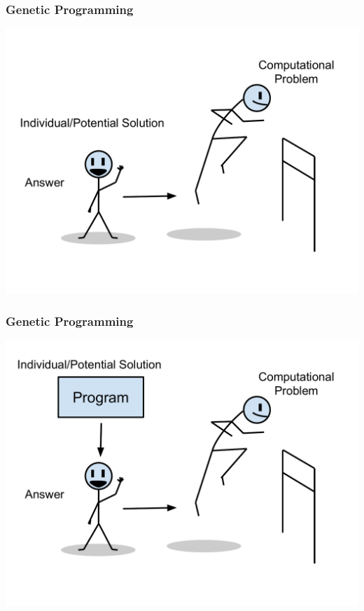 \documentclass{beamer}
\begin{document}
\begin{frame}
	\frametitle{Genetic Programming}
	\includegraphics[height=.9\textheight]{Illustrations/gp_1.PDF}
\end{frame}
\begin{frame}
	\frametitle{Genetic Programming}
	\includegraphics[height=.9\textheight]{Illustrations/gp_2.PDF}
\end{frame}
\end{document}
